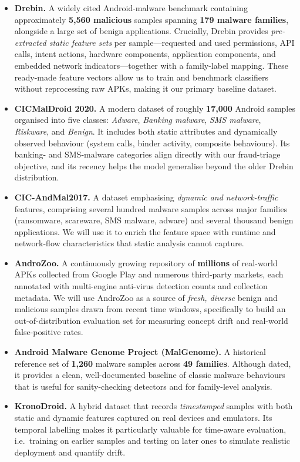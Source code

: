 \documentclass[11pt,a4paper]{article}
\newcommand{\dsname}[1]{\textbf{#1}}
\begin{document}
\begin{itemize}
  \item \dsname{Drebin.}
  A widely cited Android-malware benchmark containing approximately \textbf{5{,}560
  malicious} samples spanning \textbf{179 malware families}, alongside a large set of
  benign applications. Crucially, Drebin provides \emph{pre-extracted static feature
  sets} per sample---requested and used permissions, API calls, intent actions, hardware
  components, application components, and embedded network indicators---together with a
  family-label mapping. These ready-made feature vectors allow us to train and benchmark
  classifiers without reprocessing raw APKs, making it our primary baseline dataset.

  \item \dsname{CICMalDroid 2020.}
  A modern dataset of roughly \textbf{17{,}000} Android samples organised into five
  classes: \emph{Adware}, \emph{Banking malware}, \emph{SMS malware}, \emph{Riskware},
  and \emph{Benign}. It includes both static attributes and dynamically observed
  behaviour (system calls, binder activity, composite behaviours). Its banking- and
  SMS-malware categories align directly with our fraud-triage objective, and its recency
  helps the model generalise beyond the older Drebin distribution.

  \item \dsname{CIC-AndMal2017.}
  A dataset emphasising \emph{dynamic and network-traffic} features, comprising several
  hundred malware samples across major families (ransomware, scareware, SMS malware,
  adware) and several thousand benign applications. We will use it to enrich the feature
  space with runtime and network-flow characteristics that static analysis cannot
  capture.

  \item \dsname{AndroZoo.}
  A continuously growing repository of \textbf{millions} of real-world APKs collected
  from Google Play and numerous third-party markets, each annotated with multi-engine
  anti-virus detection counts and collection metadata. We will use AndroZoo as a source
  of \emph{fresh, diverse} benign and malicious samples drawn from recent time windows,
  specifically to build an out-of-distribution evaluation set for measuring concept
  drift and real-world false-positive rates.

  \item \dsname{Android Malware Genome Project (MalGenome).}
  A historical reference set of \textbf{1{,}260} malware samples across \textbf{49
  families}. Although dated, it provides a clean, well-documented baseline of classic
  malware behaviours that is useful for sanity-checking detectors and for family-level
  analysis.

  \item \dsname{KronoDroid.}
  A hybrid dataset that records \emph{timestamped} samples with both static and dynamic
  features captured on real devices and emulators. Its temporal labelling makes it
  particularly valuable for time-aware evaluation, i.e.\ training on earlier samples and
  testing on later ones to simulate realistic deployment and quantify drift.
\end{itemize}
\end{document}
